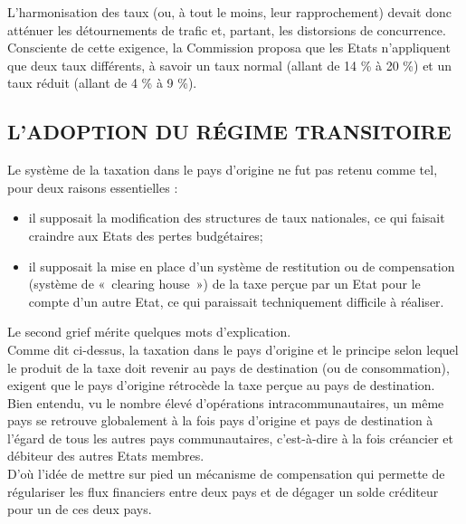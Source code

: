 \documentclass{book}
\begin{document}
L'harmonisation des taux (ou, à tout le moins, leur rapprochement) devait donc atténuer les
détournements de trafic et, partant, les distorsions de concurrence.\\

Consciente de cette exigence, la Commission proposa que les Etats n'appliquent que deux
taux différents, à savoir un taux normal (allant de 14 \% à 20 \%) et un taux réduit (allant de
4 \% à 9 \%).

\subsection{L'ADOPTION DU RÉGIME TRANSITOIRE}

Le système de la taxation dans le pays d'origine ne fut pas retenu comme tel, pour deux
raisons essentielles :\\

\begin{itemize}
\item il supposait la modification des structures de taux nationales, ce qui faisait craindre
aux Etats des pertes budgétaires;
\item il supposait la mise en place d'un système de restitution ou de compensation
(système de «~clearing house~») de la taxe perçue par un Etat pour le compte d'un
autre Etat, ce qui paraissait techniquement difficile à réaliser.

\end{itemize}

\null

Le second grief mérite quelques mots d'explication.\\

Comme dit ci-dessus, la taxation dans le pays d'origine et le principe selon lequel le produit
de la taxe doit revenir au pays de destination (ou de consommation), exigent que le pays
d'origine rétrocède la taxe perçue au pays de destination.\\

Bien entendu, vu le nombre élevé d'opérations intracommunautaires, un même pays se
retrouve globalement à la fois pays d'origine et pays de destination à l'égard de tous les autres
pays communautaires, c'est-à-dire à la fois créancier et débiteur des autres Etats membres.\\

D'où l'idée de mettre sur pied un mécanisme de compensation qui permette de régulariser les
flux financiers entre deux pays et de dégager un solde créditeur pour un de ces deux pays.\\
\end{document}
